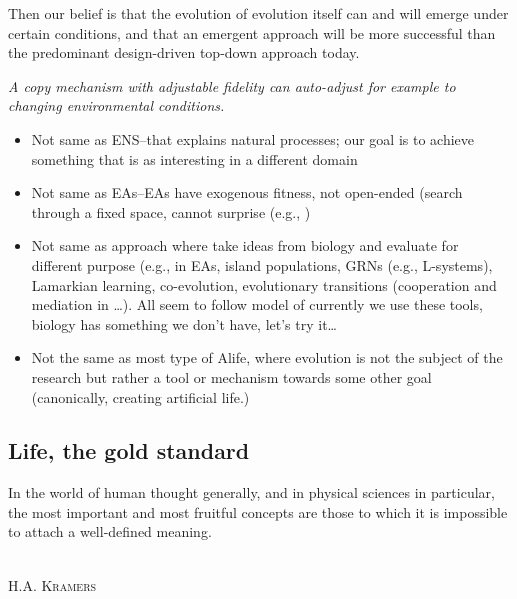 Then our belief is that the evolution of evolution itself can and will emerge under certain conditions, and that an emergent approach will be more successful than the predominant design-driven top-down approach today.


\emph{A copy mechanism with adjustable fidelity can auto-adjust for example to changing environmental conditions.}

\begin{itemize}
	\item
	      Not same as ENS--that explains natural processes; our goal is to achieve something that is as interesting in a different domain
	\item 
	      Not same as EAs--EAs have exogenous fitness, not open-ended (search through a fixed space, cannot surprise (e.g., \autocite{Nellis2014})
	\item  
	      Not same as approach where take ideas from biology and evaluate for different purpose (e.g., in EAs, island populations, GRNs (e.g., L-systems), Lamarkian learning, co-evolution, evolutionary transitions (cooperation and mediation in \autocite{Defaweux:2005fk}\ldots{}). All seem to follow model of currently we use these tools, biology has something we don't have, let's try it\ldots{}
	\item
	      Not the same as most type of Alife, where evolution is not the subject of the research but rather a tool or mechanism towards some other goal (canonically, creating artificial life.)
\end{itemize}

\subsection{Life, the gold standard}

\epigraph{%
	In the world of human thought generally, and in physical sciences in particular, the most important and most fruitful concepts are those to which it is impossible to attach a well-defined meaning.}%
{\textsc{\\H.A. Kramers}}

